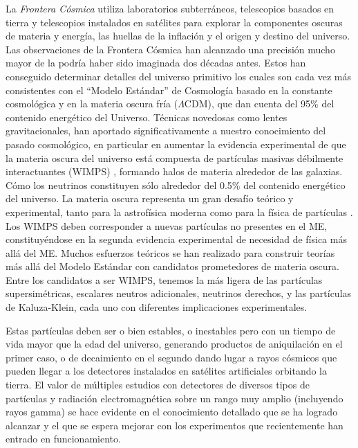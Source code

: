 La \emph{Frontera Cósmica} utiliza laboratorios subterráneos,
telescopios basados en tierra y telescopios instalados en satélites
para explorar la componentes oscuras de materia y energía, las huellas
de la inflación y el origen y destino del universo. Las observaciones
de la Frontera Cósmica han alcanzado una precisión mucho mayor de la
podría haber sido imaginada dos décadas antes. Estos han conseguido
determinar detalles del universo primitivo los cuales son cada vez más
consistentes con el ``Modelo Estándar'' de Cosmología basado en la
constante cosmológica y en la materia oscura fría ($\Lambda$CDM), que
dan cuenta del 95\% del contenido energético del Universo. Técnicas
novedosas como lentes gravitacionales, han aportado significativamente
a nuestro conocimiento del pasado cosmológico, en particular en
aumentar la evidencia experimental de que la materia oscura del
universo está compuesta de partículas masivas débilmente
interactuantes (WIMPS) \cite{Bertone:2004pz,Jungman:1995df}, formando
halos de materia alrededor de las galaxias. Cómo los neutrinos
constituyen sólo alrededor del 0.5\% del contenido energético del
universo.
La materia oscura representa un gran desafío teórico y experimental,
tanto para la astrofísica moderna como para la física de partículas
\cite{Bertone:2004pz, Amsler:2008zzb, Bertone:2010,Jungman:1995df}.
Los WIMPS deben corresponder a nuevas partículas no presentes en el
ME, constituyéndose en la segunda evidencia experimental de necesidad
de física más allá del ME.  Muchos esfuerzos teóricos se han realizado
para construir teorías más allá del Modelo Estándar con candidatos
prometedores de materia oscura. Entre los candidatos a ser WIMPS,
tenemos la más ligera de las partículas supersimétricas, escalares
neutros adicionales, neutrinos derechos, y las partículas de
Kaluza-Klein, cada uno con diferentes implicaciones experimentales.


Estas partículas deben ser o bien estables, o inestables pero con un tiempo
de vida mayor que la edad del universo, generando productos de
aniquilación en el primer caso, o de decaimiento en el segundo
dando lugar a rayos cósmicos que pueden llegar a los detectores instalados
en satélites artificiales orbitando la tierra.  El valor de múltiples
estudios con detectores de diversos tipos de partículas y radiación
electromagnética sobre un rango muy amplio (incluyendo rayos gamma) se
hace evidente en el conocimiento detallado que se ha logrado alcanzar
y el que se espera mejorar con los experimentos que recientemente han
entrado en funcionamiento.



